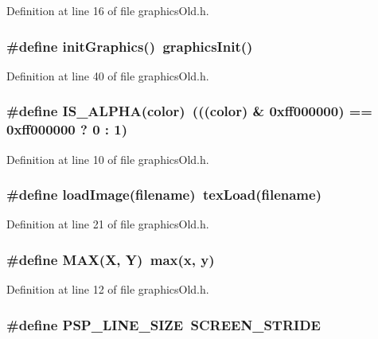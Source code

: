 Definition at line 16 of file graphics\-Old.h.
\subsubsection{\setlength{\rightskip}{0pt plus 5cm}\#define init\-Graphics()~graphics\-Init()}\label{graphicsOld_8h_39d7cad70442fe75bd303d6532363854}




Definition at line 40 of file graphics\-Old.h.
\subsubsection{\setlength{\rightskip}{0pt plus 5cm}\#define IS\_\-ALPHA(color)~(((color) \& 0xff000000) == 0xff000000 ? 0 : 1)}\label{graphicsOld_8h_eba177bc43c7d8025d5794fe5dd3dfd5}




Definition at line 10 of file graphics\-Old.h.
\subsubsection{\setlength{\rightskip}{0pt plus 5cm}\#define load\-Image(filename)~tex\-Load(filename)}\label{graphicsOld_8h_ec920fa0f8a1905ccf239c7715089736}




Definition at line 21 of file graphics\-Old.h.
\subsubsection{\setlength{\rightskip}{0pt plus 5cm}\#define MAX(X, Y)~max(x, y)}\label{graphicsOld_8h_ff9931d7524c88e07743af6535b20761}




Definition at line 12 of file graphics\-Old.h.
\subsubsection{\setlength{\rightskip}{0pt plus 5cm}\#define PSP\_\-LINE\_\-SIZE~SCREEN\_\-STRIDE}\label{graphicsOld_8h_566171f653f06e90c747b069c9cbdabd}




